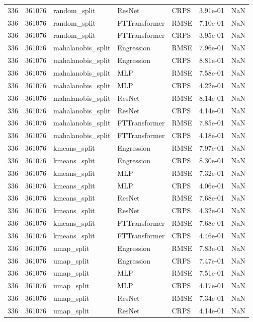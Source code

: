 \begin{tabular}{rrlllrr}
336 & 361076 & random\_split & ResNet & CRPS & 3.91e-01 & NaN \\
336 & 361076 & random\_split & FTTransformer & RMSE & 7.10e-01 & NaN \\
336 & 361076 & random\_split & FTTransformer & CRPS & 3.95e-01 & NaN \\
336 & 361076 & mahalanobis\_split & Engression & RMSE & 7.96e-01 & NaN \\
336 & 361076 & mahalanobis\_split & Engression & CRPS & 8.81e-01 & NaN \\
336 & 361076 & mahalanobis\_split & MLP & RMSE & 7.58e-01 & NaN \\
336 & 361076 & mahalanobis\_split & MLP & CRPS & 4.22e-01 & NaN \\
336 & 361076 & mahalanobis\_split & ResNet & RMSE & 8.14e-01 & NaN \\
336 & 361076 & mahalanobis\_split & ResNet & CRPS & 4.14e-01 & NaN \\
336 & 361076 & mahalanobis\_split & FTTransformer & RMSE & 7.85e-01 & NaN \\
336 & 361076 & mahalanobis\_split & FTTransformer & CRPS & 4.18e-01 & NaN \\
336 & 361076 & kmeans\_split & Engression & RMSE & 7.97e-01 & NaN \\
336 & 361076 & kmeans\_split & Engression & CRPS & 8.30e-01 & NaN \\
336 & 361076 & kmeans\_split & MLP & RMSE & 7.32e-01 & NaN \\
336 & 361076 & kmeans\_split & MLP & CRPS & 4.06e-01 & NaN \\
336 & 361076 & kmeans\_split & ResNet & RMSE & 7.68e-01 & NaN \\
336 & 361076 & kmeans\_split & ResNet & CRPS & 4.32e-01 & NaN \\
336 & 361076 & kmeans\_split & FTTransformer & RMSE & 7.68e-01 & NaN \\
336 & 361076 & kmeans\_split & FTTransformer & CRPS & 4.46e-01 & NaN \\
336 & 361076 & umap\_split & Engression & RMSE & 7.83e-01 & NaN \\
336 & 361076 & umap\_split & Engression & CRPS & 7.47e-01 & NaN \\
336 & 361076 & umap\_split & MLP & RMSE & 7.51e-01 & NaN \\
336 & 361076 & umap\_split & MLP & CRPS & 4.17e-01 & NaN \\
336 & 361076 & umap\_split & ResNet & RMSE & 7.34e-01 & NaN \\
336 & 361076 & umap\_split & ResNet & CRPS & 4.14e-01 & NaN \\

\end{tabular}

